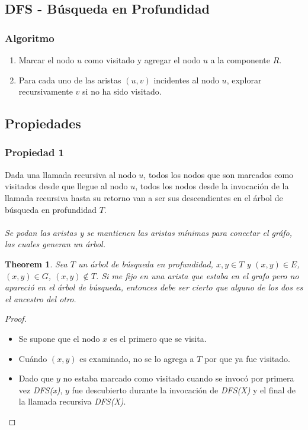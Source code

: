 \documentclass[12pt, fleqn]{article}
\newtheorem{theorem}{Theorem}[section]
\begin{document}
        \subsection{DFS - Búsqueda en Profundidad}
            \subsubsection{Algoritmo}
                \begin{enumerate}
                    \item Marcar el nodo $u$ como visitado y agregar el nodo $u$ a la componente $R$.
                    \item Para cada uno de las aristas $(u,v)$ incidentes al nodo $u$, 
                        explorar recursivamente $v$ si no ha sido visitado.
                \end{enumerate}
            \subsection{Propiedades}
                \subsubsection{Propiedad 1}
                    Dada una llamada recursiva al nodo $u$, todos los nodos que son marcados como 
                    visitados desde que llegue al nodo $u$, todos los nodos desde la invocación de la 
                    llamada recursiva hasta su retorno van a ser sus descendientes en 
                    el árbol de búsqueda en profundidad $T$.\\\\
                    \emph{Se podan las aristas y se mantienen las aristas mínimas para conectar el gráfo,
                    las cuales generan un árbol.}
                    \begin{theorem}
                        Sea $T$ un árbol de búsqueda en profundidad, $x,y \in T$ y $(x,y) \in E$,
                        $(x,y) \in G$, $(x,y) \notin T$. Si me fijo en una arista que estaba en el grafo
                        pero no apareció en el árbol de búsqueda, entonces debe ser cierto que alguno
                        de los dos es el ancestro del otro.
                    \end{theorem}
                    \begin{proof}
                        \begin{itemize}
                            \item Se supone que el nodo $x$ es el primero que se visita.
                            \item Cuándo $(x,y)$ es examinado, no se lo agrega a $T$ por que ya fue 
                                visitado.
                            \item Dado que $y$ no estaba marcado como visitado cuando se invocó por primera
                                vez \emph{DFS(x)}, $y$ fue descubierto durante la invocación de \emph{DFS(X)}
                                y el final de la llamada recursiva \emph{DFS(X)}.
                        \end{itemize}
                    \end{proof}
\end{document}
